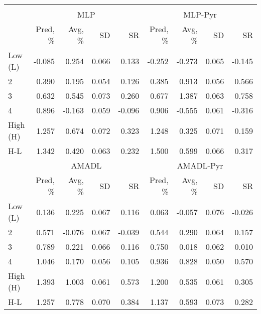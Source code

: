 \begin{tabular}{lrrrrrrrr}
\hline \hline \\ [-1.8ex]
 & \multicolumn{4}{c}{MLP} & \multicolumn{4}{c}{MLP-Pyr} \\
 \cmidrule(lr){2-5} \cmidrule(lr){6-9}
  & Pred, \% & Avg, \% & SD & SR & Pred, \% & Avg, \% & SD & SR \\
\midrule
Low (L) & -0.085 & 0.254 & 0.066 & 0.133 & -0.252 & -0.273 & 0.065 & -0.145 \\
2 & 0.390 & 0.195 & 0.054 & 0.126 & 0.385 & 0.913 & 0.056 & 0.566 \\
3 & 0.632 & 0.545 & 0.073 & 0.260 & 0.677 & 1.387 & 0.063 & 0.758 \\
4 & 0.896 & -0.163 & 0.059 & -0.096 & 0.906 & -0.555 & 0.061 & -0.316 \\
High (H) & 1.257 & 0.674 & 0.072 & 0.323 & 1.248 & 0.325 & 0.071 & 0.159 \\
H-L & 1.342 & 0.420 & 0.063 & 0.232 & 1.500 & 0.599 & 0.066 & 0.317 \\
\midrule
 & \multicolumn{4}{c}{AMADL} & \multicolumn{4}{c}{AMADL-Pyr} \\
 \cmidrule(lr){2-5} \cmidrule(lr){6-9}
  & Pred, \% & Avg, \% & SD & SR & Pred, \% & Avg, \% & SD & SR \\
\midrule
Low (L) & 0.136 & 0.225 & 0.067 & 0.116 & 0.063 & -0.057 & 0.076 & -0.026 \\
2 & 0.571 & -0.076 & 0.067 & -0.039 & 0.544 & 0.290 & 0.064 & 0.157 \\
3 & 0.789 & 0.221 & 0.066 & 0.116 & 0.750 & 0.018 & 0.062 & 0.010 \\
4 & 1.046 & 0.170 & 0.056 & 0.105 & 0.936 & 0.828 & 0.050 & 0.570 \\
High (H) & 1.393 & 1.003 & 0.061 & 0.573 & 1.200 & 0.535 & 0.061 & 0.305 \\
H-L & 1.257 & 0.778 & 0.070 & 0.384 & 1.137 & 0.593 & 0.073 & 0.282 \\
\hline \hline
\end{tabular}